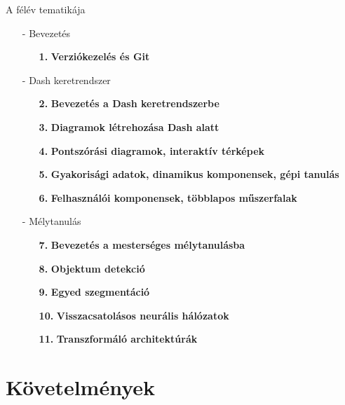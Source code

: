 \documentclass[english, aspectratio=169]{beamer}
\makeatletter
\let\origtableofcontents=\tableofcontents
\def\tableofcontents{\@ifnextchar[{\origtableofcontents}{\gobbletableofcontents}}
\def\gobbletableofcontents#1{\origtableofcontents}
\makeatother
\begin{document}
	\begin{frame}{A félév tematikája}
		
		\begin{itemize}
			\item[-] Bevezetés
			\begin{itemize}
				\item[\textbf{1.}] \textbf{Verziókezelés és Git}
			\end{itemize}
			\item[-] Dash keretrendszer
			\begin{itemize}
				\item[\textbf{2.}] \textbf{Bevezetés a Dash keretrendszerbe}
				\item[\textbf{3.}] \textbf{Diagramok létrehozása Dash alatt}
				\item[\textbf{4.}] \textbf{Pontszórási diagramok, interaktív térképek}
				\item[\textbf{5.}] \textbf{Gyakorisági adatok, dinamikus komponensek, gépi tanulás}
				\item[\textbf{6.}] \textbf{Felhasználói komponensek, többlapos műszerfalak}
			\end{itemize}
			\item[-] Mélytanulás
			\begin{itemize}
				\item[\textbf{7.}] \textbf{Bevezetés a mesterséges mélytanulásba}
				\item[\textbf{8.}] \textbf{Objektum detekció}
				\item[\textbf{9.}] \textbf{Egyed szegmentáció}
				\item[\textbf{10.}] \textbf{Visszacsatolásos neurális hálózatok}
				\item[\textbf{11.}] \textbf{Transzformáló architektúrák}
			\end{itemize}
		\end{itemize}
		
	\end{frame}
	
	\section{Követelmények}
	
	\begin{frame}{}
		\tableofcontents[currentsection]
	\end{frame}
	
\end{document}
